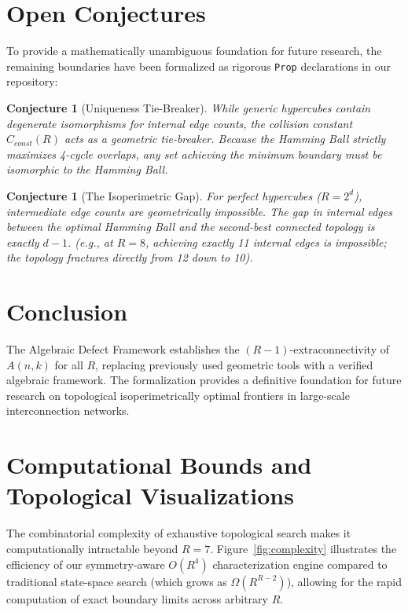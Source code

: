 \documentclass[11pt, letterpaper]{article}
\newtheorem{conjecture}[theorem]{Conjecture}
\theoremstyle{definition}
\theoremstyle{remark}
\begin{document}
\section{Open Conjectures}

To provide a mathematically unambiguous foundation for future research, the remaining boundaries have been formalized as rigorous \texttt{Prop} declarations in our repository:

\begin{conjecture}[Uniqueness Tie-Breaker]
While generic hypercubes contain degenerate isomorphisms for internal edge counts, the collision constant $C_{const}(R)$ acts as a geometric tie-breaker. Because the Hamming Ball strictly maximizes 4-cycle overlaps, any set achieving the minimum boundary must be isomorphic to the Hamming Ball.
\end{conjecture}

\begin{conjecture}[The Isoperimetric Gap]
For perfect hypercubes ($R=2^d$), intermediate edge counts are geometrically impossible. The gap in internal edges between the optimal Hamming Ball and the second-best connected topology is exactly $d-1$. (e.g., at $R=8$, achieving exactly 11 internal edges is impossible; the topology fractures directly from 12 down to 10).
\end{conjecture}

\section{Conclusion}

The Algebraic Defect Framework establishes the $(R-1)$-extraconnectivity of $A(n,k)$ for all $R$, replacing previously used geometric tools with a verified algebraic framework. The formalization provides a definitive foundation for future research on topological isoperimetrically optimal frontiers in large-scale interconnection networks.

\appendix
\section{Computational Bounds and Topological Visualizations}

The combinatorial complexity of exhaustive topological search makes it computationally intractable beyond $R=7$. Figure~\ref{fig:complexity} illustrates the efficiency of our symmetry-aware $O(R^4)$ characterization engine compared to traditional state-space search (which grows as $\Omega(R^{R-2})$), allowing for the rapid computation of exact boundary limits across arbitrary $R$.
\end{document}
